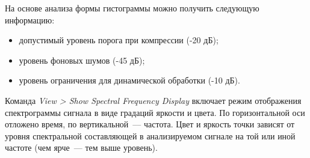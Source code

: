 \documentclass{beamer}
\begin{document}
\begin{frame}
На основе анализа формы гистограммы можно получить следующую информацию:
\begin{itemize}
\item допустимый уровень порога при компрессии (-20 дБ);
\item уровень фоновых шумов (-45 дБ);
\item уровень ограничения для динамической обработки (-10 дБ).
\end{itemize}
\end{frame}  

\begin{frame}
Команда \textit{View > Show Spectral Frequency Display} включает режим отображения спектрограммы сигнала в виде градаций яркости и цвета. По горизонтальной оси отложено время, по вертикальной~--– частота. Цвет и яркость точки зависят от уровня спектральной составляющей в анализируемом сигнале на той или иной частоте (чем ярче~--- тем выше уровень). 
\end{frame} 
\end{document}
